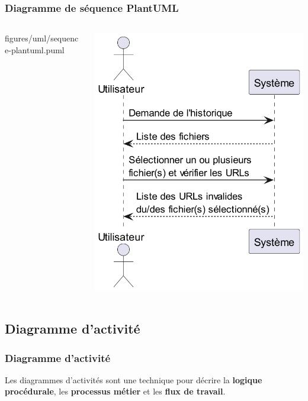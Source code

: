 \begin{frame}
    \frametitle{Diagramme de séquence PlantUML}
    \begin{columns}
        \begin{column}{0.4\textwidth}
            
            {figures/uml/sequence-plantuml.puml}
        \end{column}
        \begin{column}{0.6\textwidth}
            \centering
            \includegraphics[height=0.8\linewidth]{figures/uml/sequence-plantuml}
        \end{column}
    \end{columns}
\end{frame}

\subsection{Diagramme d'activité}
\label{subsec:diagramme-activite}

\begin{frame}
    \frametitle{Diagramme d'activité}
    Les diagrammes d'activités sont une technique pour décrire
    la \textbf{logique procédurale}, les \textbf{processus métier} et les \textbf{flux de travail}.
\end{frame}

